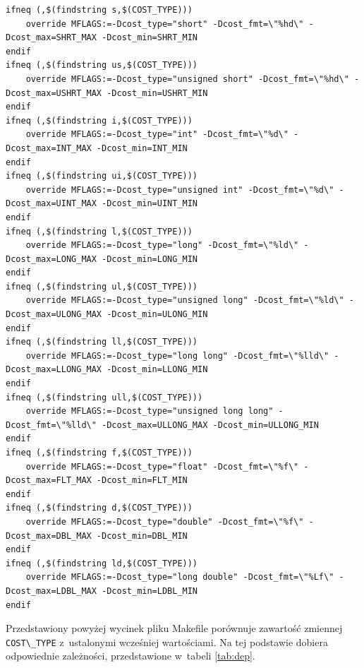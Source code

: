 \documentclass[a4paper,12pt,polish,oneside,openright]{thesis}
\newcommand\code[1]{\lstinline[style=line]{#1}}
\begin{document}
\begin{lstlisting}[style=code,caption=Makefile - blok decydujący o zmiennej cost]
ifneq (,$(findstring s,$(COST_TYPE)))
	override MFLAGS:=-Dcost_type="short" -Dcost_fmt=\"%hd\" -Dcost_max=SHRT_MAX -Dcost_min=SHRT_MIN
endif
ifneq (,$(findstring us,$(COST_TYPE)))
	override MFLAGS:=-Dcost_type="unsigned short" -Dcost_fmt=\"%hd\" -Dcost_max=USHRT_MAX -Dcost_min=USHRT_MIN
endif
ifneq (,$(findstring i,$(COST_TYPE)))
	override MFLAGS:=-Dcost_type="int" -Dcost_fmt=\"%d\" -Dcost_max=INT_MAX -Dcost_min=INT_MIN
endif
ifneq (,$(findstring ui,$(COST_TYPE)))
	override MFLAGS:=-Dcost_type="unsigned int" -Dcost_fmt=\"%d\" -Dcost_max=UINT_MAX -Dcost_min=UINT_MIN
endif
ifneq (,$(findstring l,$(COST_TYPE)))
	override MFLAGS:=-Dcost_type="long" -Dcost_fmt=\"%ld\" -Dcost_max=LONG_MAX -Dcost_min=LONG_MIN
endif
ifneq (,$(findstring ul,$(COST_TYPE)))
	override MFLAGS:=-Dcost_type="unsigned long" -Dcost_fmt=\"%ld\" -Dcost_max=ULONG_MAX -Dcost_min=ULONG_MIN
endif
ifneq (,$(findstring ll,$(COST_TYPE)))
	override MFLAGS:=-Dcost_type="long long" -Dcost_fmt=\"%lld\" -Dcost_max=LLONG_MAX -Dcost_min=LLONG_MIN
endif
ifneq (,$(findstring ull,$(COST_TYPE)))
	override MFLAGS:=-Dcost_type="unsigned long long" -Dcost_fmt=\"%lld\" -Dcost_max=ULLONG_MAX -Dcost_min=ULLONG_MIN
endif
ifneq (,$(findstring f,$(COST_TYPE)))
	override MFLAGS:=-Dcost_type="float" -Dcost_fmt=\"%f\" -Dcost_max=FLT_MAX -Dcost_min=FLT_MIN
endif
ifneq (,$(findstring d,$(COST_TYPE)))
	override MFLAGS:=-Dcost_type="double" -Dcost_fmt=\"%f\" -Dcost_max=DBL_MAX -Dcost_min=DBL_MIN
endif
ifneq (,$(findstring ld,$(COST_TYPE)))
	override MFLAGS:=-Dcost_type="long double" -Dcost_fmt=\"%Lf\" -Dcost_max=LDBL_MAX -Dcost_min=LDBL_MIN
endif
\end{lstlisting}

Przedstawiony powyżej wycinek pliku Makefile porównuje zawartość zmiennej \code{COST\_TYPE} z~ustalonymi wcześniej wartościami. Na tej podstawie dobiera odpowiednie zależności, przedstawione w~tabeli \ref{tab:dep}.
\end{document}
